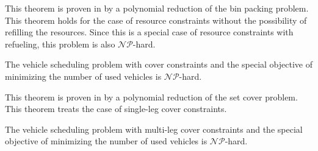 This theorem is proven in \cite[p. 11]{Kaiser_Knoll} by a polynomial reduction of the bin packing problem. This theorem holds for the case of resource constraints without the possibility of refilling the resources. Since this is a special case of resource constraints with refueling, this problem is also $\mathcal{NP}$-hard. 

\begin{theorem}
\label{th:complexity_VSPSC}

The vehicle scheduling problem with cover constraints and the special objective of minimizing the number of used vehicles is $\mathcal{NP}$-hard.

\end{theorem}

This theorem is proven in \cite[p. 12]{Kaiser_Knoll} by a polynomial reduction of the set cover problem. This theorem treats the case of single-leg cover constraints.

\begin{theorem}
\label{th:complexity_VSPMC}

The vehicle scheduling problem with multi-leg cover constraints and the special objective of minimizing the number of used vehicles is $\mathcal{NP}$-hard.

\end{theorem}

